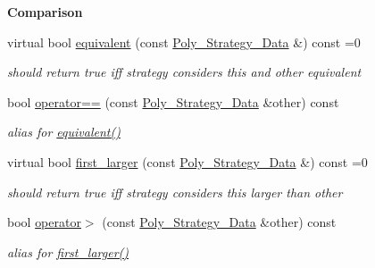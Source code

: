 \begin{Indent}\textbf{ Comparison}\par
\begin{DoxyCompactItemize}
\item 
\mbox{\label{group__strategygroup_aa82a57a8bf9b3c14fd65a573fd78a4a5}} 
virtual bool \hyperlink{group__strategygroup_aa82a57a8bf9b3c14fd65a573fd78a4a5}{equivalent} (const \hyperlink{group__strategygroup_class_poly___strategy___data}{Poly\+\_\+\+Strategy\+\_\+\+Data} \&) const =0
\begin{DoxyCompactList}\small\item\em should return {\ttfamily true} iff strategy considers {\ttfamily this} and other equivalent \end{DoxyCompactList}\item 
\mbox{\label{group__strategygroup_a5c88b8a0a17d4175bf43ccab5d7ded4f}} 
bool \hyperlink{group__strategygroup_a5c88b8a0a17d4175bf43ccab5d7ded4f}{operator==} (const \hyperlink{group__strategygroup_class_poly___strategy___data}{Poly\+\_\+\+Strategy\+\_\+\+Data} \&other) const
\begin{DoxyCompactList}\small\item\em alias for \hyperlink{group__strategygroup_aa82a57a8bf9b3c14fd65a573fd78a4a5}{equivalent()} \end{DoxyCompactList}\item 
\mbox{\label{group__strategygroup_a6cd4608015a6b0f06141b9b73b0d4137}} 
virtual bool \hyperlink{group__strategygroup_a6cd4608015a6b0f06141b9b73b0d4137}{first\+\_\+larger} (const \hyperlink{group__strategygroup_class_poly___strategy___data}{Poly\+\_\+\+Strategy\+\_\+\+Data} \&) const =0
\begin{DoxyCompactList}\small\item\em should return {\ttfamily true} iff strategy considers {\ttfamily this} larger than other \end{DoxyCompactList}\item 
\mbox{\label{group__strategygroup_a4100b95343145b454dca2978545dd791}} 
bool \hyperlink{group__strategygroup_a4100b95343145b454dca2978545dd791}{operator$>$} (const \hyperlink{group__strategygroup_class_poly___strategy___data}{Poly\+\_\+\+Strategy\+\_\+\+Data} \&other) const
\begin{DoxyCompactList}\small\item\em alias for \hyperlink{group__strategygroup_a6cd4608015a6b0f06141b9b73b0d4137}{first\+\_\+larger()} \end{DoxyCompactList}\item 

\end{DoxyCompactItemize}
\end{Indent}
